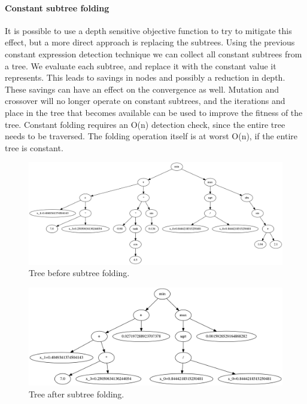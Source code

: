 \paragraph{Constant subtree folding}
It is possible to use a depth sensitive objective function to try to mitigate this effect, but a more direct approach is replacing the subtrees.
Using the previous constant expression detection technique we can collect all constant subtrees from a tree. We evaluate each subtree, and replace it with the constant value it represents. This leads to savings in nodes and possibly a reduction in depth. These savings can have an effect on the convergence as well. Mutation and crossover will no longer operate on constant subtrees, and the iterations and place in the tree that becomes available can be used to improve the fitness of the tree.
Constant folding requires an O(n) detection check, since the entire tree needs to be traversed. The folding operation itself is at worst O(n), if the entire tree is constant.
\begin{figure}
    \centering
    \includegraphics[width=\textwidth,height=\textheight,keepaspectratio]{figures/prefold.png}
    \caption{Tree before subtree folding.}
    \label{fig:prefold}
\end{figure}
\begin{figure}
    \centering
    \includegraphics[width=\textwidth,height=\textheight,keepaspectratio]{figures/postfold.png}
    \caption{Tree after subtree folding.}
    \label{fig:postfold}
\end{figure}

